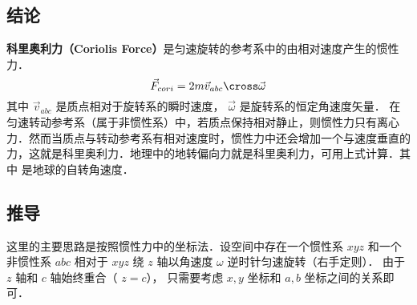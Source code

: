 

\subsection{结论}
\textbf{科里奥利力（Coriolis Force）}是匀速旋转的参考系中的由相对速度产生的惯性力．
\begin{equation}
{\vec F_{cori}} = 2m{\vec v_{abc}} \cross \vec \omega
\end{equation}
其中 $\vec v_{abc}$ 是质点相对于旋转系的瞬时速度， $\vec\omega$ 是旋转系的恒定角速度矢量．%
在匀速转动参考系（属于非惯性系）中，若质点保持相对静止，则惯性力只有离心力．然而当质点与转动参考系有相对速度时，惯性力中还会增加一个与速度垂直的力，这就是科里奥利力．地理中的地转偏向力就是科里奥利力，可用上式计算．其中 是地球的自转角速度．

\subsection{推导}
这里的主要思路是按照惯性力中的坐标法．设空间中存在一个惯性系 $xyz$ 和一个非惯性系 $abc$ 相对于 $xyz$ 绕 $z$ 轴以角速度 $\omega$ 逆时针匀速旋转（右手定则）．%
由于 $z$ 轴和 $c$ 轴始终重合（ $z=c$）， 只需要考虑 $x,y$ 坐标和 $a,b$ 坐标之间的关系即可．

